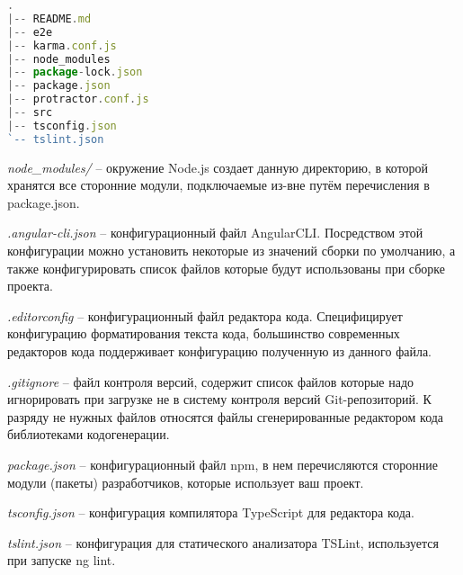 \begin{lstlisting}[language=TypeScript, captionpos=b,
label={lis:web-root-structure},
caption={Пример структуры корневой директории проекта}]
.
|-- README.md
|-- e2e
|-- karma.conf.js
|-- node_modules
|-- package-lock.json
|-- package.json
|-- protractor.conf.js
|-- src
|-- tsconfig.json
`-- tslint.json

\end{lstlisting}

\textit{node\_modules/} – окружение Node.js создает данную директорию, в которой хранятся все сторонние модули, подключаемые из-вне путём перечисления в package.json.

\textit{.angular-cli.json} – конфигурационный файл AngularCLI. Посредством этой конфигурации можно установить некоторые из значений сборки по умолчанию, 
а также конфигурировать список файлов которые будут использованы при сборке проекта.

\textit{.editorconfig} – конфигурационный файл редактора кода. Специфицирует конфигурацию форматирования текста кода, 
большинство современных редакторов кода поддерживает конфигурацию полученную из данного файла.

\textit{.gitignore} – файл контроля версий, содержит список файлов которые надо игнорировать при загрузке не в систему контроля версий Git-репозиторий.
К разряду не нужных файлов относятся файлы сгенерированные редактором кода библиотеками кодогенерации.

\textit{package.json} – конфигурационный файл npm, в нем перечисляются сторонние модули (пакеты) разработчиков, которые использует ваш проект.

\textit{tsconfig.json} – конфигурация компилятора TypeScript для редактора кода.

\textit{tslint.json} – конфигурация для статического анализатора TSLint, используется при запуске ng lint.
